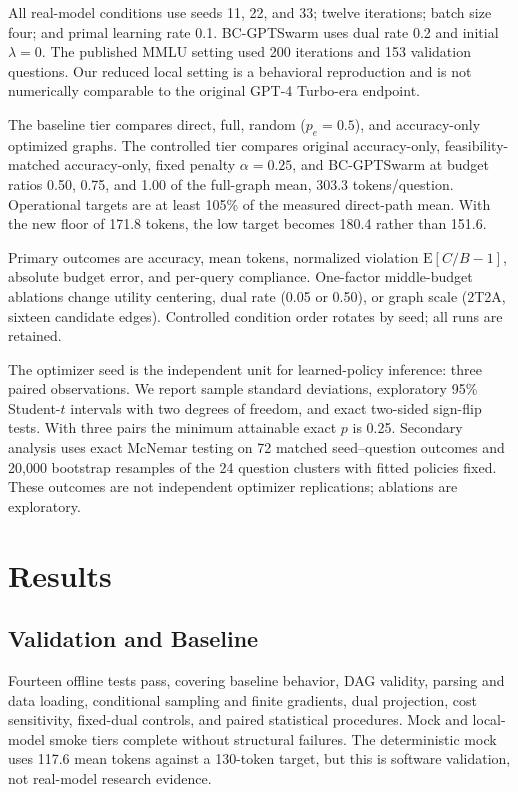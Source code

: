\documentclass[journal]{IEEEtran}
\begin{document}
All real-model conditions use seeds 11, 22, and 33; twelve iterations; batch size four; and primal learning rate 0.1. BC-GPTSwarm uses dual rate 0.2 and initial $\lambda=0$. The published MMLU setting used 200 iterations and 153 validation questions. Our reduced local setting is a behavioral reproduction and is not numerically comparable to the original GPT-4 Turbo-era endpoint.

The baseline tier compares direct, full, random ($p_e=0.5$), and accuracy-only optimized graphs. The controlled tier compares original accuracy-only, feasibility-matched accuracy-only, fixed penalty $\alpha=0.25$, and BC-GPTSwarm at budget ratios 0.50, 0.75, and 1.00 of the full-graph mean, 303.3 tokens/question. Operational targets are at least 105\% of the measured direct-path mean. With the new floor of 171.8 tokens, the low target becomes 180.4 rather than 151.6.

Primary outcomes are accuracy, mean tokens, normalized violation $\mathrm{E}[C/B-1]$, absolute budget error, and per-query compliance. One-factor middle-budget ablations change utility centering, dual rate (0.05 or 0.50), or graph scale (2T2A, sixteen candidate edges). Controlled condition order rotates by seed; all runs are retained.

The optimizer seed is the independent unit for learned-policy inference: three paired observations. We report sample standard deviations, exploratory 95\% Student-$t$ intervals with two degrees of freedom, and exact two-sided sign-flip tests. With three pairs the minimum attainable exact $p$ is 0.25. Secondary analysis uses exact McNemar testing on 72 matched seed--question outcomes and 20,000 bootstrap resamples of the 24 question clusters with fitted policies fixed. These outcomes are not independent optimizer replications; ablations are exploratory.
\section{Results}
\subsection{Validation and Baseline}
Fourteen offline tests pass, covering baseline behavior, DAG validity, parsing and data loading, conditional sampling and finite gradients, dual projection, cost sensitivity, fixed-dual controls, and paired statistical procedures. Mock and local-model smoke tiers complete without structural failures. The deterministic mock uses 117.6 mean tokens against a 130-token target, but this is software validation, not real-model research evidence.
\end{document}
